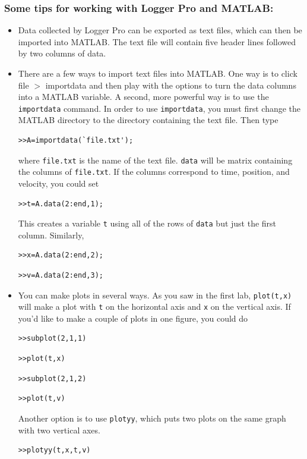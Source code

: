 \documentclass[11pt,letterpaper]{article}
\begin{document}
\subsubsection*{Some tips for working with Logger Pro and MATLAB:}
\begin{itemize}
\item Data collected by Logger Pro can be exported as text files, which can then be imported into MATLAB. The text file will contain five header lines followed by two columns of data.

\item There are a few ways to import text files into MATLAB. One way is to click file $>$ importdata and then play with the options to turn the data columns into a MATLAB variable. A second, more powerful way is to use the \verb+importdata+ command. In order to use \verb+importdata+, you must first change the MATLAB directory to the directory containing the text file. Then type 
\begin{verbatim}>>A=importdata(`file.txt');\end{verbatim} 
where \verb+file.txt+ is the name of the text file. \verb+data+ will be matrix containing the columns of \verb+file.txt+. If the columns correspond to time, position, and velocity, you could set
\begin{verbatim}>>t=A.data(2:end,1);\end{verbatim}
This creates a variable \verb+t+ using all of the rows of \verb+data+ but just the first column. Similarly,
\begin{verbatim}>>x=A.data(2:end,2);\end{verbatim}
\begin{verbatim}>>v=A.data(2:end,3);\end{verbatim}

\item You can make plots in several ways. As you saw in the first lab, \verb+plot(t,x)+ will make a plot with \verb+t+ on the horizontal axis and \verb+x+ on the vertical axis. If you'd like to make a couple of plots in one figure, you could do
\begin{verbatim}>>subplot(2,1,1)\end{verbatim}
\begin{verbatim}>>plot(t,x)\end{verbatim}
\begin{verbatim}>>subplot(2,1,2)\end{verbatim}
\begin{verbatim}>>plot(t,v)\end{verbatim}
Another option is to use \verb+plotyy+, which puts two plots on the same graph with two vertical axes.
\begin{verbatim}>>plotyy(t,x,t,v)\end{verbatim}


\end{itemize}
\end{document}
